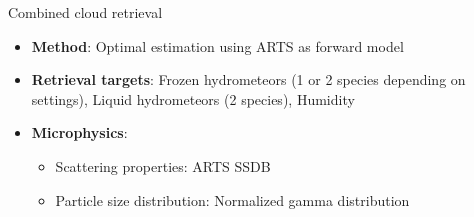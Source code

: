 \documentclass[8pt, final,hyperref={pdfpagelabels=false}]{beamer}
\begin{document}
\begin{frame}
\begin{columns}[t]
\begin{column}{.48\linewidth}
        \vspace{-2cm}
        \begin{block}{Combined cloud retrieval}

          \begin{itemize}
          \item \textbf{Method}: Optimal estimation using ARTS  \citep{arts} as forward model
          \item \textbf{Retrieval targets}: Frozen hydrometeors (1 or 2 species
            depending on settings), Liquid hydrometeors (2 species), Humidity
          \item \textbf{Microphysics}:
           \begin{itemize}
             \item Scattering properties:  ARTS SSDB \citep{arts_ssdb}
             \item Particle size distribution: Normalized gamma distribution \citep{delanoe}

           \end{itemize}
          \end{itemize}\\[1cm]


\end{block}
\end{column}
\end{columns}
\end{frame}
\end{document}

